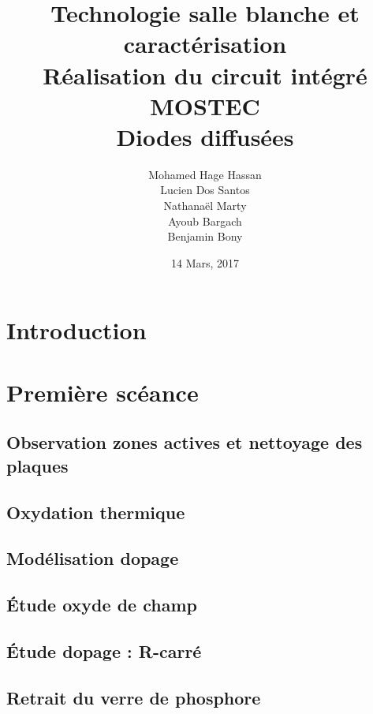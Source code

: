 \documentclass[11pt]{article}
\begin{document}
\title{\textbf{Technologie salle blanche et caract\'erisation}\\ R\'ealisation du circuit int\'egr\'e MOSTEC \\ Diodes diffus\'ees}
\author{Mohamed Hage Hassan \\ Lucien Dos Santos \\ Nathanaël Marty \\ Ayoub Bargach \\ Benjamin Bony}
\date{14 Mars, 2017}
\maketitle

\tableofcontents
\clearpage

\section{Introduction}


\section{Premi\`ere sc\'eance}

\subsection{Observation zones actives et nettoyage des plaques}

\subsection{Oxydation thermique}

\subsection{Mod\'elisation dopage}

\subsection{\'Etude oxyde de champ}

\subsection{\'Etude dopage : R-carr\'e}

\subsection{Retrait du verre de phosphore}
\end{document}
